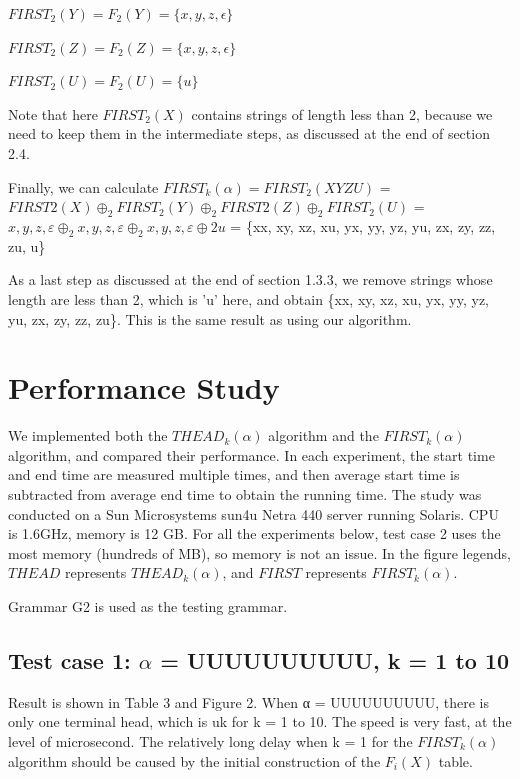 \documentclass{sig-alternate-05-2015}
\begin{document}
$FIRST_2(Y) = F_2(Y) = \{x, y, z, \epsilon\}$

$FIRST_2(Z) = F_2(Z) = \{x, y, z, \epsilon\}$

$FIRST_2(U) = F_2(U) = \{u\}$

\hfill

Note that here $FIRST_2(X)$ contains strings of length less
than 2, because we need to keep them in the intermediate
steps, as discussed at the end of section 2.4.

Finally, we can calculate $FIRST_k(\alpha) = FIRST_2(XYZU)$
= $FIRST2(X)\oplus_2FIRST_2(Y)\oplus_2 FIRST2(Z)\oplus_2 FIRST_2(U)$
= ${x, y, z, ε}\oplus_2{x, y, z, ε}\oplus_2{x, y, z, ε}\oplus2{u}$
= \{xx, xy, xz, xu, yx, yy, yz, yu, zx, zy, zz, zu, u\}

As a last step as discussed at the end of section 1.3.3, we
remove strings whose length are less than 2, which is 'u'
here, and obtain \{xx, xy, xz, xu, yx, yy, yz, yu, zx, zy, zz,
zu\}. This is the same result as using our algorithm.


\section{Performance Study}
We implemented both the $THEAD_k(\alpha)$ algorithm and the
$FIRST_k(\alpha)$ algorithm, and compared their performance. In
each experiment, the start time and end time are measured
multiple times, and then average start time is subtracted
from average end time to obtain the running time. The
study was conducted on a Sun Microsystems sun4u Netra
440 server running Solaris. CPU is 1.6GHz, memory is 12
GB. For all the experiments below, test case 2 uses the
most memory (hundreds of MB), so memory is not an issue.
In the figure legends, $THEAD$ represents $THEAD_k(\alpha)$,
and $FIRST$ represents $FIRST_k(\alpha)$.

Grammar G2 is used as the testing grammar.

\subsection{Test case 1: $\alpha$ = UUUUUUUUUU, k = 1 to 10}
Result is shown in Table 3 and Figure 2. When α =
UUUUUUUUUU, there is only one terminal head, which is
uk for k = 1 to 10. The speed is very fast, at the level of
microsecond. The relatively long delay when k = 1 for the
$FIRST_k(\alpha)$ algorithm should be caused by the initial construction
of the $F_i(X)$ table.
\end{document}
